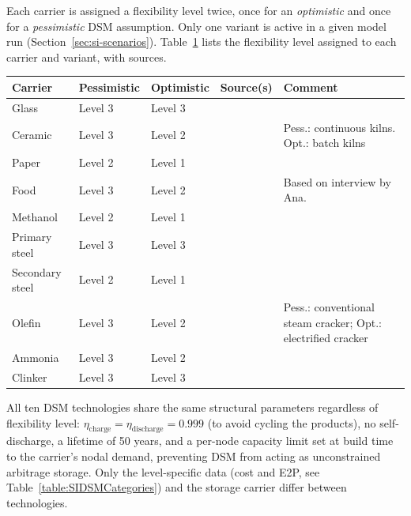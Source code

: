 Each carrier is assigned a flexibility level twice, once for an \emph{optimistic} and once for a \emph{pessimistic} DSM assumption. Only one variant is active in a given model run (Section~\ref{sec:si-scenarios}). Table~\ref{table:SIDSMCategorization} lists the flexibility level assigned to each carrier and variant, with sources. \\

\begin{table}[h!]
	\centering
	\label{table:SIDSMCategorization}
	\begin{tabular}{lll l >{\raggedright\arraybackslash}p{45mm}}
		\toprule
		Carrier & Pessimistic & Optimistic & Source(s) & Comment \\
		\midrule
		Glass & Level 3 & Level 3 & \cite{Hubert2015,Hongtai2024} & \\
		Ceramic & Level 3 & Level 2 & \cite{Tangram2026} & Pess.: continuous kilns. Opt.: batch kilns \\
		Paper & Level 2 & Level 1 & \cite{Helin2017} & \\
		Food & Level 3 & Level 2 & \cite{AnaInterview2026} & Based on interview by Ana. \\
		Methanol & Level 2 & Level 1 & \cite{Schneider2023,ChenYang2021} & \\
		Primary steel & Level 3 & Level 3 & \cite{Boldrini2024,Golmohamadi2021} &  \\
		Secondary steel & Level 2 & Level 1 & \cite{Boldrini2024,Golmohamadi2021} & \\
		Olefin & Level 3 & Level 2 & \cite{Tiggeloven2023} & Pess.: conventional steam cracker; Opt.: electrified cracker \\
		Ammonia & Level 3 & Level 2 & \cite{Salmon2023,Fahr2025} & \\
		Clinker & Level 3 & Level 3 & \cite{Golmohamadi2021} & \\
		\bottomrule
	\end{tabular}
\end{table}

All ten DSM technologies share the same structural parameters regardless of flexibility level: $\eta_\mathrm{charge}=\eta_\mathrm{discharge}=0.999$ (to avoid cycling the products), no self-discharge, a lifetime of 50 years, and a per-node capacity limit set at build time to the carrier's nodal demand, preventing DSM from acting as unconstrained arbitrage storage. Only the level-specific data (cost and E2P, see Table~\ref{table:SIDSMCategories}) and the storage carrier differ between technologies. \\

